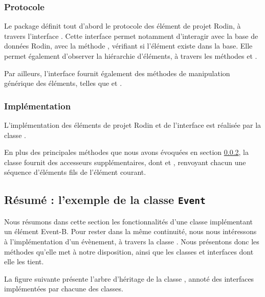 \subsubsection{Protocole}

Le package  définit tout d'abord le protocole des élément de projet Rodin, à travers l'interface .
Cette interface permet notamment d'interagir avec la base de données Rodin, avec la méthode , vérifiant si l'élément existe dans la base.
Elle permet également d'observer la hiérarchie d'éléments, à travers les méthodes  et .

Par ailleurs, l'interface  fournit également des méthodes de manipulation générique des éléments, telles que  et %
.


\subsubsection{Implémentation}\label{sec:rodinProjectElementProtocol}

L'implémentation des éléments de projet Rodin et de l'interface  est réalisée par la classe .

En plus des principales méthodes que nous avons évoquées en section \ref{sec:rodinProjectElementProtocol}, la classe  fournit %
des accesseurs supplémentaires, dont  et , renvoyant chacun une séquence d'éléments fils de l'élément courant.


\subsection{Résumé : l'exemple de la classe \texttt{Event}}\label{sec:rodinApiSummaryEvent}

Nous résumons dans cette section les fonctionnalités d'une classe implémentant un élément Event-B.
Pour rester dans la même continuité, nous nous intéressons à l'implémentation d'un évènement, à travers la classe .
Nous présentons donc les méthodes qu'elle met à notre disposition, ainsi que les classes et interfaces dont elle les tient.

La figure suivante présente l'arbre d'héritage de la classe , annoté des interfaces implémentées par chacune des classes.


